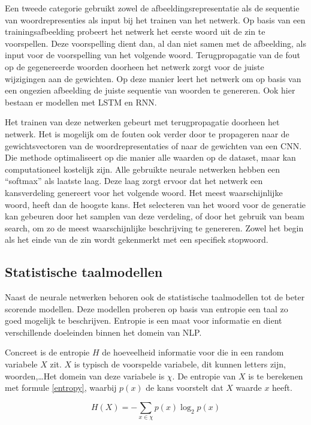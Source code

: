 Een tweede categorie gebruikt zowel de afbeeldingsrepresentatie als de sequentie van 
woordrepresenties als input bij het trainen van het netwerk. Op basis van een trainingsafbeelding probeert het netwerk het eerste woord uit de zin te voorspellen. Deze voorspelling dient dan, al dan niet samen met de afbeelding, als input voor de voorspelling van het volgende woord. Terugpropagatie van de fout op de gegenereerde woorden doorheen het netwerk zorgt voor de juiste wijzigingen aan de gewichten. Op deze manier leert het netwerk om op basis van een ongezien afbeelding de juiste sequentie van woorden te genereren. Ook hier bestaan er modellen met LSTM \cite{Donahue2015,Google} en RNN\cite{Karpathy2015}. 

Het trainen van deze netwerken gebeurt met terugpropagatie doorheen het netwerk. Het is mogelijk om de fouten ook verder door te propageren naar de gewichtsvectoren van de woordrepresentaties of naar de gewichten van een CNN. Die methode optimaliseert op die manier alle waarden op de  dataset, maar kan computationeel kostelijk zijn.
Alle gebruikte neurale netwerken hebben een ``softmax'' als laatste laag. Deze laag zorgt ervoor dat het netwerk een kansverdeling genereert voor het volgende woord. Het meest waarschijnlijke woord, heeft dan de hoogste kans.
Het selecteren van het woord voor de generatie kan gebeuren door het samplen van deze verdeling, of door het gebruik van beam search, om zo de meest waarschijnlijke beschrijving te genereren.  Zowel het begin als het einde van de zin wordt gekenmerkt met een specifiek stopwoord.

\subsection{Statistische taalmodellen}
Naast de neurale netwerken behoren ook de statistische taalmodellen tot de beter scorende modellen. Deze modellen proberen op basis van entropie een taal zo goed mogelijk te beschrijven. Entropie is een maat voor informatie en dient verschillende doeleinden binnen het domein van NLP. 

Concreet is de entropie $H$ de hoeveelheid informatie voor die in een random variabele $X$ zit. $X$ is typisch de voorspelde variabele, dit kunnen letters zijn, woorden,\ldots Het domein van deze variabele is $\chi$. De entropie van $X$ is te berekenen met formule \eqref{entropy}, waarbij $p(x)$ de kans voorstelt dat $X$ waarde $x$ heeft\cite{Jurafsky:2009:SLP:1214993}.

\begin{equation}
     H(X) = -\sum_{x \in \chi}p(x)\log_2p(x)
     \label{entropy}
 \end{equation} 

